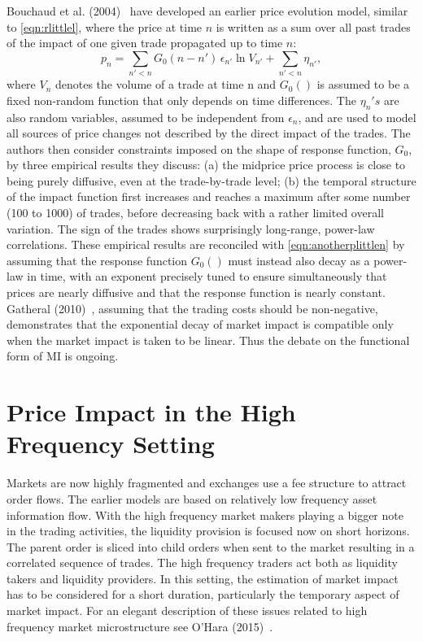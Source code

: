 Bouchaud et al. (2004)~\cite{bouchaud2004} have developed an earlier price evolution model, similar to \eqref{eqn:rlittlel}, where the price at time $n$ is written as a sum over all past trades of the impact of one given trade propagated up to time $n$:
	\begin{equation} \label{eqn:anotherplittlen}
	p_n = \sum_{n'<n} G_0(n - n')\,\epsilon_{n'} \ln{V_{n'}} + \sum_{n'<n} \eta_{n'},
	\end{equation}
where $V_n$ denotes the volume of a trade at time n and $G_0()$ is assumed to be a fixed non-random function that only depends on time differences. The $\eta_n's$ are also random variables, assumed to be independent from $\epsilon_n$, and are used to model all sources of price changes not described by the direct impact of the trades. The authors then consider constraints imposed on the shape of response function, $G_0$, by three empirical results they discuss: (a) the midprice price process is close to being purely diffusive, even at the trade-by-trade level; (b) the temporal structure of the impact function first increases and reaches a maximum after some number (100 to 1000) of trades, before decreasing back with a rather limited overall variation. The sign of the trades shows surprisingly long-range, power-law correlations. These empirical results are reconciled with \eqref{eqn:anotherplittlen} by assuming that the response function $G_0()$ must instead also decay as a power-law in time, with an exponent precisely tuned to ensure simultaneously that prices are nearly diffusive and that the response function is nearly constant. Gatheral (2010)~\cite{gatheral}, assuming that the trading costs should be non-negative, demonstrates that the exponential decay of market impact is compatible only when the market impact is taken to be linear. Thus the debate on the functional form of MI is ongoing. \label{in:style10}



\section{Price Impact in the High Frequency Setting\label{sec:price_impact_hfs}}

Markets are now highly fragmented and exchanges use a fee structure to attract order flows. The earlier models are based on relatively low frequency asset information flow. With the high frequency market makers playing a bigger note in the trading activities, the liquidity provision is focused now on short horizons. The parent order is sliced into child orders when sent to the market resulting in a correlated sequence of trades. The high frequency traders act both as liquidity takers and liquidity providers. In this setting, the estimation of market impact has to be considered for a short duration, particularly the temporary aspect of market impact. For an elegant description of these issues related to high frequency market microstructure see O'Hara (2015)~\cite{ohara15hfmm}.


